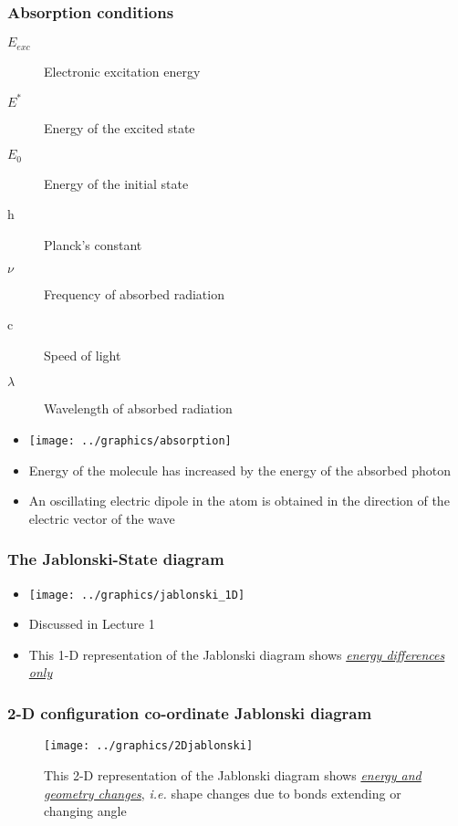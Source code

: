 \documentclass[ignorenonframetext]{beamer}
\begin{document}
\begin{frame}[allowframebreaks]
\frametitle{Absorption conditions}

\begin{description}
\item[\(E_{exc}\)] Electronic excitation energy
\item[\(E^*\)] Energy of the excited state
\item[\(E_0\)] Energy of the initial state
\item[h] Planck's constant
\item[\(\nu\)] Frequency of absorbed radiation
\item[c] Speed of light
\item[\(\lambda\)] Wavelength of absorbed radiation
\end{description}

\begin{itemize}
\item[ ] \texttt{[image: ../graphics/absorption]}
\item Energy of the molecule has increased by the energy of the absorbed photon
\item An oscillating electric dipole in the atom is obtained in the direction of the electric vector of the wave
\end{itemize}

\end{frame}

\begin{frame}
\frametitle{The Jablonski-State diagram}
\begin{itemize}
\item[] \texttt{[image: ../graphics/jablonski\_1D]}
\item Discussed in Lecture 1
\item This 1-D representation of the Jablonski diagram shows \textit{\underline{energy differences only}}
\end{itemize}
\end{frame}

\begin{frame}
\frametitle{2-D configuration co-ordinate Jablonski diagram}
\centering
\begin{figure}[h!]
\texttt{[image: ../graphics/2Djablonski]}
\caption{This 2-D representation of the Jablonski diagram shows \textit{\underline{energy and geometry changes}}, \textit{i.e.} shape changes due to bonds extending or changing angle}
\end{figure}
\end{frame}
\end{document}
